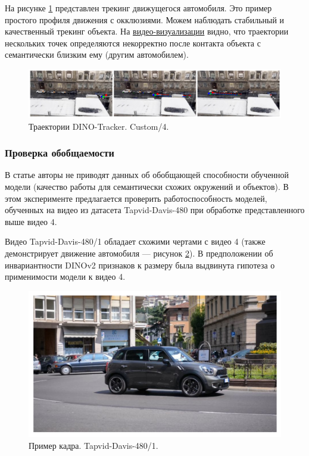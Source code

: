 \documentclass[a4paper, 14pt]{extarticle}
\theoremstyle{definition}
\theoremstyle{plain}
\theoremstyle{remark}
\begin{document}
На рисунке \ref{fig:custom-4} представлен трекинг движущегося автомобиля. Это пример простого профиля движения с окклюзиями. Можем наблюдать стабильный и качественный трекинг объекта. На \href{https://drive.google.com/file/d/1c1rivtgAYqveos9xyPtBjhV8Nz-x64h2/view?usp=drive_link}{видео-визуализации} видно, что траектории нескольких точек определяются некорректно после контакта объекта с семантически близким ему (другим автомобилем). 
\begin{figure}
    [H]
    \centering
    \includegraphics[width=\textwidth]{figs/custom-4.png}
    \caption{Траектории DINO-Tracker. Custom/4.}
    \label{fig:custom-4}
\end{figure}

\subsubsection{Проверка обобщаемости}
В статье авторы не приводят данных об обобщающей способности обученной модели (качество работы для семантически схожих окружений и объектов). В этом эксперименте предлагается проверить работоспособность моделей, обученных на видео из датасета Tapvid-Davis-480 при обработке представленного выше видео 4.

Видео Tapvid-Davis-480/1 обладает схожими чертами с видео 4 (также демонстрирует движение автомобиля --- рисунок \ref{fig:davis-1-expl}). В предположении об инвариантности DINOv2 признаков к размеру была выдвинута гипотеза о применимости модели к видео 4.
\begin{figure}
    [H]
    \centering
    \includegraphics[width=\textwidth]{figs/davis-1_expl.png}
    \caption{Пример кадра. Tapvid-Davis-480/1.}
    \label{fig:davis-1-expl}
\end{figure}
\end{document}
